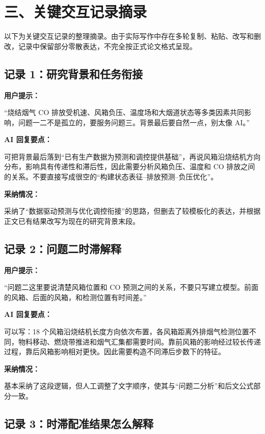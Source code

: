 \documentclass[UTF8,a4paper,zihao=-4]{ctexart}
\begin{document}
\section*{三、关键交互记录摘录}

以下为关键交互记录的整理摘录。由于实际写作中存在多轮复制、粘贴、改写和删改，记录中保留部分零散表达，不完全按正式论文格式呈现。

\subsection*{记录 1：研究背景和任务衔接}

\noindent\textbf{用户提示：}

“烧结烟气 CO 排放受机速、风箱负压、温度场和大烟道状态等多类因素共同影响，问题一二不是孤立的，要服务问题三。背景最后要自然一点，别太像 AI。”

\noindent\textbf{AI 回复要点：}

可把背景最后落到“已有生产数据为预测和调控提供基础”，再说风箱沿烧结机方向分布，影响具有传递性和滞后性，因此需要分析风箱负压、温度和 CO 排放之间的关系。不要直接写成很空的“构建状态表征--排放预测--负压优化”。

\noindent\textbf{采纳情况：}

采纳了“数据驱动预测与优化调控衔接”的思路，但删去了较模板化的表达，并根据正文已有结果改写为现在的研究背景末段。

\subsection*{记录 2：问题二时滞解释}

\noindent\textbf{用户提示：}

“问题二这里要说清楚风箱位置和 CO 预测之间的关系，不要只写建立模型。前面的风箱、后面的风箱，和检测位置有时间差。”

\noindent\textbf{AI 回复要点：}

可以写：18 个风箱沿烧结机长度方向依次布置，各风箱距离外排烟气检测位置不同，物料移动、燃烧带推进和烟气汇集都需要时间。靠前风箱的影响经过较长传递过程，靠后风箱影响相对更快。因此需要构造不同滞后步数下的特征。

\noindent\textbf{采纳情况：}

基本采纳了这段逻辑，但人工调整了文字顺序，使其与“问题二分析”和后文公式部分一致。

\subsection*{记录 3：时滞配准结果怎么解释}
\end{document}
